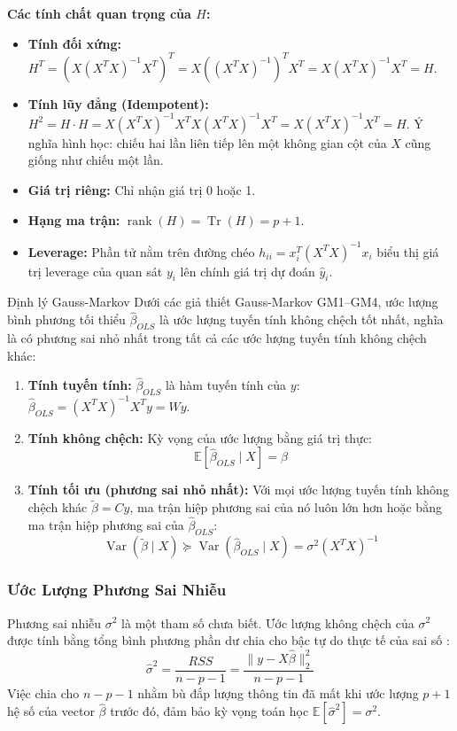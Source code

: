 \documentclass[12pt,a4paper]{article}
\begin{document}
\noindent\textbf{Các tính chất quan trọng của $H$:}
\begin{itemize}
    \item \textbf{Tính đối xứng:} $H^T = (X(X^T X)^{-1} X^T)^T = X((X^T X)^{-1})^T X^T = X(X^T X)^{-1} X^T = H$.
    \item \textbf{Tính lũy đẳng (Idempotent):} $H^2 = H \cdot H = X(X^T X)^{-1} X^T X (X^T X)^{-1} X^T = X(X^T X)^{-1} X^T = H$. Ý nghĩa hình học: chiếu hai lần liên tiếp lên một không gian cột của $X$ cũng giống như chiếu một lần.
    \item \textbf{Giá trị riêng:} Chỉ nhận giá trị 0 hoặc 1.
    \item \textbf{Hạng ma trận:} $\operatorname{rank}(H) = \operatorname{Tr}(H) = p+1$.
    \item \textbf{Leverage:} Phần tử nằm trên đường chéo $h_{ii} = x_i^T (X^T X)^{-1} x_i$ biểu thị giá trị leverage của quan sát $y_i$ lên chính giá trị dự đoán $\hat{y}_i$.
\end{itemize}

\begin{theorembox}{Định lý Gauss-Markov}
Dưới các giả thiết Gauss-Markov GM1--GM4, ước lượng bình phương tối thiểu $\hat{\beta}_{OLS}$ là ước lượng tuyến tính không chệch tốt nhất, nghĩa là có phương sai nhỏ nhất trong tất cả các ước lượng tuyến tính không chệch khác:
\begin{enumerate}
    \item \textbf{Tính tuyến tính:} $\hat{\beta}_{OLS}$ là hàm tuyến tính của $y$: $\hat{\beta}_{OLS} = (X^T X)^{-1} X^T y = W y$.
    \item \textbf{Tính không chệch:} Kỳ vọng của ước lượng bằng giá trị thực:
    \begin{equation}
        \mathbb{E}[\hat{\beta}_{OLS} \mid X] = \beta
    \end{equation}
    \item \textbf{Tính tối ưu (phương sai nhỏ nhất):} Với mọi ước lượng tuyến tính không chệch khác $\tilde{\beta} = C y$, ma trận hiệp phương sai của nó luôn lớn hơn hoặc bằng ma trận hiệp phương sai của $\hat{\beta}_{OLS}$:
    \begin{equation}
        \operatorname{Var}(\tilde{\beta} \mid X) \succeq \operatorname{Var}(\hat{\beta}_{OLS} \mid X) = \sigma^2 (X^T X)^{-1}
    \end{equation}
\end{enumerate}
\end{theorembox}

\subsubsection{Ước Lượng Phương Sai Nhiễu}
Phương sai nhiễu $\sigma^2$ là một tham số chưa biết. Ước lượng không chệch của $\sigma^2$ được tính bằng tổng bình phương phần dư chia cho bậc tự do thực tế của sai số \cite{james}:
\begin{equation}
    \hat{\sigma}^2 = \frac{RSS}{n - p - 1} = \frac{\|y - X\hat{\beta}\|_2^2}{n - p - 1}
\end{equation}
Việc chia cho $n - p - 1$ nhằm bù đắp lượng thông tin đã mất khi ước lượng $p+1$ hệ số của vector $\hat{\beta}$ trước đó, đảm bảo kỳ vọng toán học $\mathbb{E}[\hat{\sigma}^2] = \sigma^2$.
\end{document}
